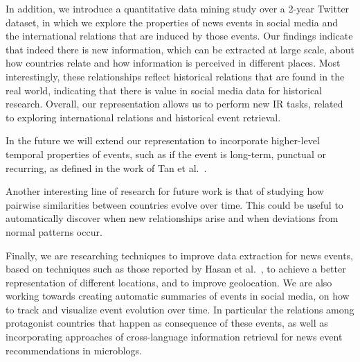 In addition, we introduce a quantitative data mining study over a 2-year Twitter
dataset, in which we explore the properties of news events in social media and
the international relations that are induced by those events.  
%
Our findings indicate that indeed there is new information, which can be
extracted at large scale, about how countries relate and how information is
perceived in different places. 
%
Most interestingly, these relationships reflect historical relations that are
found in the real world, indicating that there is value in social media data for
historical research.
%
Overall, our representation allows us to perform new IR tasks, related to
exploring international relations and historical event retrieval.


In the future we will extend our representation to incorporate higher-level
temporal properties of events, such as if the event is long-term, punctual or
recurring, as defined in the work of Tan et al.~\cite{st-model_2009}.
%

Another interesting line of research for future work is that of studying how
pairwise similarities between countries evolve over time. 
%
This could be useful to automatically discover when new relationships arise and
when deviations from normal patterns occur.

Finally, we are researching techniques to improve data extraction for news
events, based on techniques such as those reported by Hasan et
al.~\cite{doi:10.1177/0165551517698564}, to achieve a better representation of
different locations, and to improve geolocation. 
%
We are also working towards creating automatic summaries of events in social
media, on how to track and visualize event evolution over time. 
%
In particular the relations among protagonist countries that happen as
consequence of these events, as well as incorporating approaches of
cross-language information retrieval\cite{grefenstette2012cross} for news event
recommendations in microblogs.